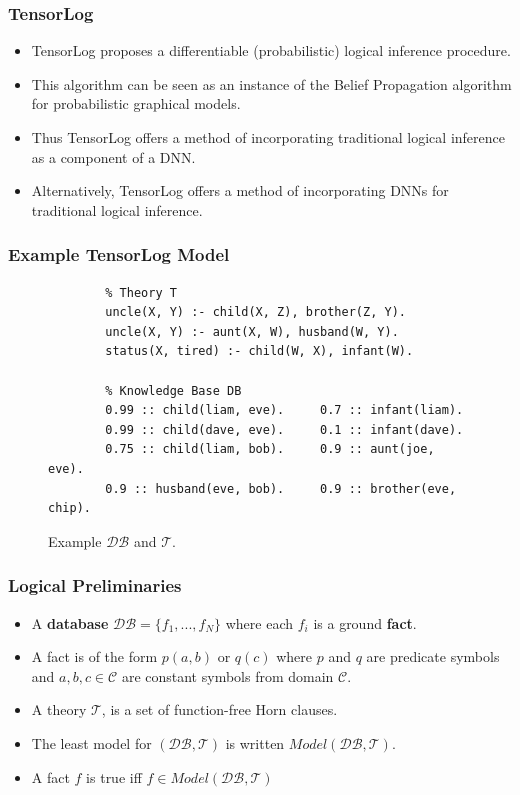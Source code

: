 \documentclass{beamer}
\begin{document}
\begin{frame}
\frametitle{TensorLog}
\begin{itemize}
	\item TensorLog proposes a differentiable (probabilistic) logical inference procedure.
	\item This algorithm can be seen as an instance of the Belief Propagation algorithm for probabilistic graphical models.
	\item Thus TensorLog offers a method of incorporating traditional logical inference as a component of a DNN.
	\item Alternatively, TensorLog offers a method of incorporating DNNs for traditional logical inference.
\end{itemize}
\end{frame}

\begin{frame}[fragile]
\frametitle{Example TensorLog Model}
\begin{figure}
	\begin{center}
		\begin{verbatim}
		% Theory T
		uncle(X, Y) :- child(X, Z), brother(Z, Y).
		uncle(X, Y) :- aunt(X, W), husband(W, Y).
		status(X, tired) :- child(W, X), infant(W).
		
		% Knowledge Base DB
		0.99 :: child(liam, eve).     0.7 :: infant(liam).
		0.99 :: child(dave, eve).     0.1 :: infant(dave).
		0.75 :: child(liam, bob).     0.9 :: aunt(joe, eve).
		0.9 :: husband(eve, bob).     0.9 :: brother(eve, chip).
		\end{verbatim}
	\end{center}
	\caption{Example $\mathcal{DB}$ and $\mathcal{T}$.}
\end{figure}
\end{frame}

\begin{frame}
\frametitle{Logical Preliminaries}
\begin{itemize}
	\item A \textbf{database} $\mathcal{DB} = \{f_1, ..., f_N \}$ where each $f_i$ is a ground \textbf{fact}.
	\item A fact is of the form $p(a, b)$ or $q(c)$ where $p$ and $q$ are predicate symbols and $a, b, c \in \mathcal{C}$ are constant symbols from domain $\mathcal{C}$.
	\item A theory $\mathcal{T}$, is a set
	of function-free Horn clauses.
	\item The least model for $(\mathcal{DB}, \mathcal{T})$ is written $Model(\mathcal{DB}, \mathcal{T})$.
	\item A fact $f$ is true iff $f \in Model(\mathcal{DB}, \mathcal{T})$
\end{itemize}
\end{frame}
\end{document}

